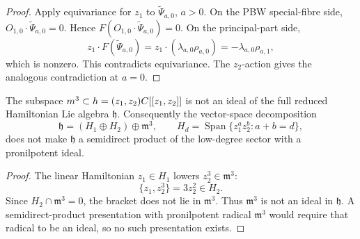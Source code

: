 \begin{proof}
  Apply equivariance for \(z_1\) to \(\widetilde\Psi_{a,0}\), \(a>0\).  On the
  PBW special-fibre side,
  \(O_{1,0}\cdot\widetilde\Psi_{a,0}=0\).  Hence
  \(F(O_{1,0}\cdot\widetilde\Psi_{a,0})=0\).  On the principal-part side,
  \[
    z_1\cdot F(\widetilde\Psi_{a,0})
    =
    z_1\cdot(\lambda_{a,0}\rho_{a,0})
    =
    -\lambda_{a,0}\rho_{a,1},
  \]
  which is nonzero.  This contradicts equivariance.  The \(z_2\)-action
  gives the analogous contradiction at \(a=0\).
\end{proof}

\begin{prop}\label{prop:lane-low-degree-pronilpotent-obstruction}
  The subspace \(m^3\subset h=(z_1,z_2)C[[z_1,z_2]]\)
  is not an ideal of the full reduced Hamiltonian Lie algebra
  \(\mathfrak h\).  Consequently the vector-space decomposition
  \[
    \mathfrak h=(H_1\oplus H_2)\oplus\mathfrak m^3,
    \qquad
    H_d=\operatorname{Span}\{z_1^az_2^b:a+b=d\},
  \]
  does not make \(\mathfrak h\) a semidirect product of the low-degree
  sector with a pronilpotent ideal.
\end{prop}

\begin{proof}
  The linear Hamiltonian \(z_1\in H_1\) lowers \(z_2^3\in\mathfrak m^3\):
  \[
    \{z_1,z_2^3\}=3z_2^2\in H_2.
  \]
  Since \(H_2\cap\mathfrak m^3=0\), the bracket does not lie in
  \(\mathfrak m^3\).  Thus \(\mathfrak m^3\) is not an ideal in
  \(\mathfrak h\).  A semidirect-product presentation with
  pronilpotent radical \(\mathfrak m^3\) would require that radical to
  be an ideal, so no such presentation exists.
\end{proof}

